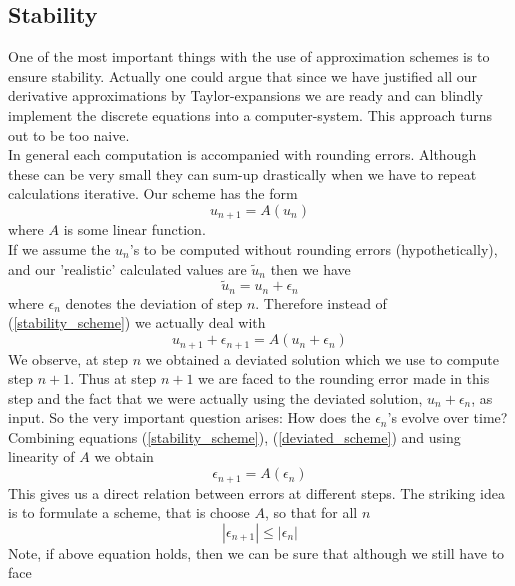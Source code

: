 \documentclass[]{article}
\begin{document}
\subsection{Stability} \label{stability}
One of the most important things with the use of approximation
schemes is to ensure stability.
Actually one could argue that since we have justified all our derivative approximations by Taylor-expansions we are ready and can blindly implement the discrete equations into 
a computer-system. This approach turns out to be too naive.\\
In general each computation is accompanied with rounding errors. Although these can be very small they can sum-up drastically when we have to repeat calculations iterative.
Our scheme has the form 
\begin{equation} \label{stability_scheme}
u_{n+1}=A(u_{n})
\end{equation}
where $A$ is some linear function. \\
If we assume the $u_{n}$'s to be computed without rounding errors (hypothetically), and our 
'realistic' calculated values are $\tilde{u}_{n}$ then we have
\begin{equation}
\tilde{u}_{n}=u_{n}+\epsilon_{n}
\end{equation}
where $\epsilon_{n}$ denotes the deviation of step $n$.
Therefore instead of (\ref{stability_scheme}) we actually deal with
\begin{equation} \label{deviated_scheme}
u_{n+1}+\epsilon_{n+1}=A(u_{n}+\epsilon_{n})
\end{equation}
We observe, at step $n$ we obtained a deviated solution which we use to compute step $n+1$.
Thus at step $n+1$ we are faced to the rounding error made in this step and the fact that we
were actually using the deviated solution, $u_{n}+\epsilon_{n}$, as input.
So the very important question arises: How does the $\epsilon_{n}$'s evolve over time?\\
Combining equations (\ref{stability_scheme}), (\ref{deviated_scheme}) and using linearity of $A$ we obtain
\begin{equation} \label{error_scheme}
\epsilon_{n+1}=A(\epsilon_{n})
\end{equation}
This gives us a direct relation between errors at different steps.
The striking idea is to formulate a scheme, that is choose $A$, so that for all $n$
\begin{equation} \label{scheme_error}
|\epsilon_{n+1}| \leq |\epsilon_{n} |
\end{equation}
Note, if above equation holds, then we can be sure that although we still have to face 
\end{document}
